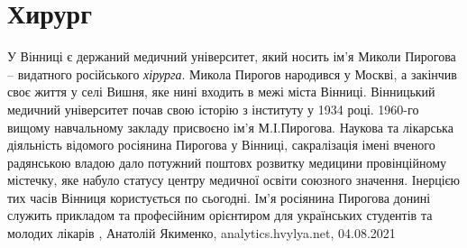  
 
 
 
 
\chapter{Хирург}

У Вінниці є держаний медичний університет, який носить ім’я Миколи Пирогова –
видатного російського \emph{хірурга}. Микола Пирогов народився у Москві, а закінчив
своє життя у селі Вишня, яке нині входить в межі міста Вінниці.
Вінницький медичний університет почав свою історію з інституту у 1934 році.
1960-го вищому навчальному закладу присвоєно ім’я М.І.Пирогова. Наукова та
лікарська діяльність відомого росіянина Пирогова у Вінниці, сакралізація імені
вченого радянською владою дало потужний поштовх розвитку медицини провінційному
містечку, яке набуло статусу центру медичної освіти союзного значення. Інерцією
тих часів Вінниця користується по сьогодні. Ім’я росіянина Пирогова донині
служить прикладом та професійним орієнтиром для українських студентів та
молодих лікарів
, 
Анатолій Якименко, analytics.hvylya.net, 04.08.2021
